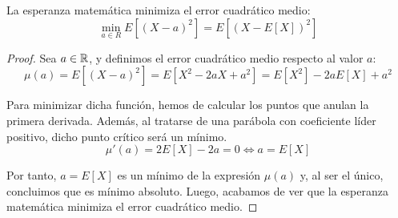 \begin{prop}
    La esperanza matemática minimiza el error cuadrático medio:
    $$\min_{a \in R} E[(X-a)^2] = E[(X-E[X])^2]$$
\end{prop}
\begin{proof}
    Sea $a \in \mathbb R$, y definimos el error cuadrático medio respecto al valor $a$:
    $$\mu(a) = E[(X-a)^2] = E[X^2-2aX+a^2] = E[X^2] - 2aE[X] + a^2$$

    Para minimizar dicha función, hemos de calcular los puntos que anulan la primera derivada. Además, al tratarse de una parábola con coeficiente líder positivo, dicho punto crítico será un mínimo.
    $$\mu'(a) = 2E[X] - 2a = 0 \Longleftrightarrow a = E[X]$$

    Por tanto, $a=E[X]$ es un mínimo de la expresión $\mu(a)$ y, al ser el único, concluimos que es mínimo absoluto.
    Luego, acabamos de ver que la esperanza matemática minimiza el error cuadrático medio.
\end{proof}

